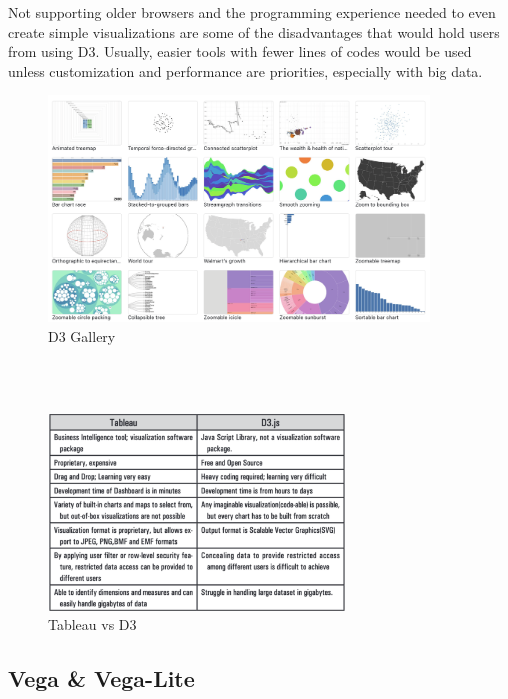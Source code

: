 Not supporting older browsers and the programming experience needed to even create simple visualizations are some of the disadvantages that would hold users from using D3. Usually, easier tools with fewer lines of codes would be used unless customization and performance are priorities, especially with big data. 

\begin{figure}[H]
\centering
\captionsetup{justification=centering}
\includegraphics[width=0.9\textwidth]{Report-latex/tex_files/pics/d3.png}
\caption{D3 Gallery \cite{d3g}}
\label{fig:d3}
\end{figure}

\\\

\begin{figure}[H]
\centering
\captionsetup{justification=centering}
\includegraphics[width=0.7\textwidth]{Report-latex/tex_files/pics/tVd3.png}
\caption{Tableau vs D3 \cite{nair2016interactive}}
\label{fig:tableauvsd3}
\end{figure}

\subsection{Vega \& Vega-Lite}

